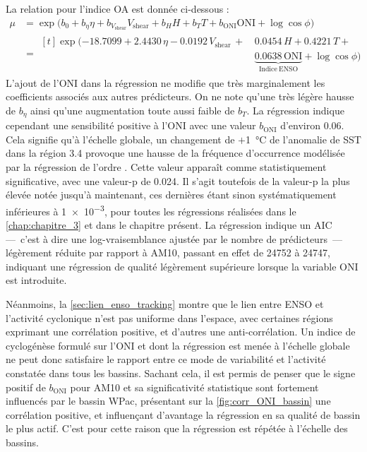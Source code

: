 \documentclass[../main.tex]{subfiles}
\begin{document}
La relation pour l'indice OA est donnée ci-dessous :
%
\begin{align*}
    \tag{OA}
    \mu &= \exp \big( b_0 + b_\eta \eta + b_{V_{\mathrm{shear}}} V_{\mathrm{shear}} + b_H H + b_T T + b_{\mathrm{ONI}} \mathrm{ONI} + \log \cos \phi \big)\\
        &= \begin{aligned}[t]\exp \big( \num{-18.7099} + \num{2.4430}\, \eta - \num{0.0192}\, V_{\mathrm{shear}} \,+\, &\num{0.0454}\, H + \num{0.4221}\, T + \\&\underbrace{\num{0.0638}\, \mathrm{ONI}}_{\mathrm{Indice\ ENSO}} + \log \cos \phi \big)\end{aligned}
\end{align*}
%
L'ajout de l'ONI dans la régression ne modifie que très marginalement les coefficients associés aux autres prédicteurs. On ne note qu'une très légère hausse de
$b_\eta$ ainsi qu'une augmentation toute aussi faible de $b_T$. La régression indique cependant une sensibilité positive à l'ONI avec une valeur
$b_{\mathrm{ONI}}$ d'environ \num{0.06}. Cela signifie qu'à l'échelle globale, un changement de $+$\SI{1}{\degreeCelsius} de l'anomalie de SST dans la région
3.4 provoque une hausse de la fréquence d'occurrence modélisée par la régression de l'ordre . Cette valeur apparaît comme statistiquement significative,
avec une valeur-p de \num{0.024}. Il s'agit toutefois de la valeur-p la plus élevée notée jusqu'à maintenant, ces dernières étant sinon systématiquement
inférieures à \num{1e-3}, pour toutes les régressions réalisées dans le \cref{chap:chapitre_3} et dans le chapitre présent. La régression indique un AIC
\parencite[\textit{Akaike Information Criterion},][]{akaike_information_1998} ---~c'est à dire une log-vraisemblance ajustée par le nombre de prédicteurs~---
légèrement réduite par rapport à AM10, passant en effet de \num{24752} à \num{24747}, indiquant une régression de qualité légèrement supérieure lorsque la
variable ONI est introduite.

Néanmoins, la \cref{sec:lien_enso_tracking} montre que le lien entre ENSO et l'activité cyclonique n'est pas uniforme dans l'espace, avec certaines régions
exprimant une corrélation positive, et d'autres une anti-corrélation. Un indice de cyclogénèse formulé sur l'ONI et dont la régression est menée à l'échelle
globale ne peut donc satisfaire le rapport entre ce mode de variabilité et l'activité constatée dans tous les bassins. Sachant cela, il est permis de penser que
le signe positif de $b_{\mathrm{ONI}}$ pour AM10 et sa significativité statistique sont fortement influencés par le bassin WPac, présentant sur la
\cref{fig:corr_ONI_bassin} une corrélation positive, et influençant d'avantage la régression en sa qualité de bassin le plus actif. C'est pour cette raison que la
régression est répétée à l'échelle des bassins.
\end{document}
